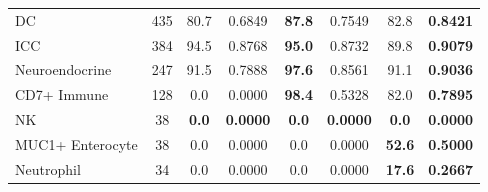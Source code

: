 \begin{table}[H]
{\begin{tabular}{lc|cc|cc|cc}
DC & 435 & 80.7 & 0.6849 & \textbf{87.8} & 0.7549 & 82.8 & \textbf{0.8421} \\
ICC & 384 & 94.5 & 0.8768 & \textbf{95.0} & 0.8732 & 89.8 & \textbf{0.9079} \\
Neuroendocrine & 247 & 91.5 & 0.7888 & \textbf{97.6} & 0.8561 & 91.1 & \textbf{0.9036} \\
CD7+ Immune & 128 & 0.0 & 0.0000 & \textbf{98.4} & 0.5328 & 82.0 & \textbf{0.7895} \\
NK & 38 & \textbf{0.0} & \textbf{0.0000} & \textbf{0.0} & \textbf{0.0000} & \textbf{0.0} & \textbf{0.0000} \\
MUC1+ Enterocyte & 38 & 0.0 & 0.0000 & 0.0 & 0.0000 & \textbf{52.6} & \textbf{0.5000} \\
Neutrophil & 34 & 0.0 & 0.0000 & 0.0 & 0.0000 & \textbf{17.6} & \textbf{0.2667} \\
\bottomrule
\end{tabular}
}
\end{table}
